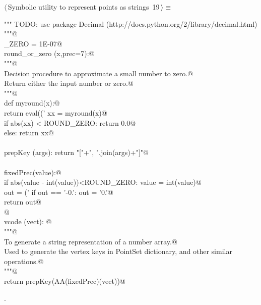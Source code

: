 \documentclass[11pt,oneside]{article}	%
\begin{document}
\begin{flushleft} \small \label{scrap45}
\protect{}$\langle\,$Symbolic utility to represent points as strings\nobreak\ {\footnotesize 19}$\,\rangle\equiv$
\vspace{-1ex}
\begin{list}{}{} \item
\mbox{}\verb@""" TODO: use package Decimal (http://docs.python.org/2/library/decimal.html) """@\\
\mbox{}\verb@ROUND_ZERO = 1E-07@\\
\mbox{}\verb@def round_or_zero (x,prec=7):@\\
\mbox{}\verb@   """@\\
\mbox{}\verb@   Decision procedure to approximate a small number to zero.@\\
\mbox{}\verb@   Return either the input number or zero.@\\
\mbox{}\verb@   """@\\
\mbox{}\verb@   def myround(x):@\\
\mbox{}\verb@      return eval(('%.'+str(prec)+'f') % round(x,prec))@\\
\mbox{}\verb@   xx = myround(x)@\\
\mbox{}\verb@   if abs(xx) < ROUND_ZERO: return 0.0@\\
\mbox{}\verb@   else: return xx@\\
\mbox{}\verb@@\\
\mbox{}\verb@def prepKey (args): return "["+", ".join(args)+"]"@\\
\mbox{}\verb@@\\
\mbox{}\verb@def fixedPrec(value):@\\
\mbox{}\verb@   if abs(value - int(value))<ROUND_ZERO: value = int(value)@\\
\mbox{}\verb@   out = ('%0.7f'% value).rstrip('0')@\\
\mbox{}\verb@   if out == '-0.': out = '0.'@\\
\mbox{}\verb@   return out@\\
\mbox{}\verb@   @\\
\mbox{}\verb@def vcode (vect): @\\
\mbox{}\verb@   """@\\
\mbox{}\verb@   To generate a string representation of a number array.@\\
\mbox{}\verb@   Used to generate the vertex keys in PointSet dictionary, and other similar operations.@\\
\mbox{}\verb@   """@\\
\mbox{}\verb@   return prepKey(AA(fixedPrec)(vect))@\\
\mbox{}\verb@@{\NWsep}
\end{list}
\vspace{-1ex}
\footnotesize\addtolength{\baselineskip}{-1ex}
\begin{list}{}{\setlength{\itemsep}{-\parsep}\setlength{\itemindent}{-\leftmargin}}
\item {\NWtxtMacroNoRef}.
\end{list}
\end{flushleft}




\end{document}
